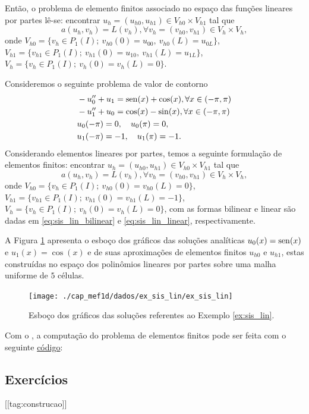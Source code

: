 Então, o problema de elemento finitos associado no espaço das funções lineares por partes lê-se: encontrar $u_h = (u_{h0}, u_{h1})\in V_{h0}\times V_{h1}$ tal que
\begin{equation}
  a(u_h, v_h) = L(v_h), \forall v_h = (v_{h0}, v_{h1})\in V_h\times V_h,
\end{equation}
onde $V_{h0} = \{v_h\in P_1(I);~v_{h0}(0)=u_{00},~v_{h0}(L)=u_{0L}\}$, $V_{h1}=\{v_{h1}\in P_1(I);~v_{h1}(0)=u_{10},~v_{h1}(L)=u_{1L}\}$, $V_h = \{v_h\in P_1(I);~v_h(0)=v_h(L)=0\}$.

\begin{ex}\label{ex:sis_lin}
  Consideremos o seguinte problema de valor de contorno
\begin{align}
  &-u_0'' + u_1 = \operatorname{sen}(x)+\cos(x),\forall x\in (-\pi, \pi)\\ 
  &-u_1'' + u_0 = \cos(x)-\sin(x),\forall x\in (-\pi, \pi)\\
  &u_0(-\pi)=0,\quad u_0(\pi)=0,\\
  &u_1(-\pi)=-1,\quad u_1(\pi)=-1.
\end{align}
Considerando elementos lineares por partes, temos a seguinte formulação de elementos finitos: encontrar $u_h = (u_{h0}, u_{h1})\in V_{h0}\times V_{h1}$ tal que
\begin{equation}
  a(u_h, v_h) = L(v_h), \forall v_h = (v_{h0}, v_{h1})\in V_h\times V_h,
\end{equation}
onde $V_{h0} = \{v_h\in P_1(I);~v_{h0}(0)=v_{h0}(L)=0\}$, $V_{h1}=\{v_{h1}\in P_1(I);~v_{h1}(0)=v_{h1}(L)=-1\}$, $V_h = \{v_h\in P_1(I);~v_h(0)=v_h(L)=0\}$, com as formas bilinear e linear são dadas em \eqref{eq:sis_lin_bilinear} e \eqref{eq:sis_lin_linear}, respectivamente.

A Figura \ref{fig:ex_sis_lin} apresenta o esboço dos gráficos das soluções analíticas $u_0(x)=\operatorname{sen}(x)$ e $u_1(x)=\cos(x)$ e de suas aproximações de elementos finitos $u_{h0}$ e $u_{h1}$, estas construídas no espaço dos polinômios lineares por partes sobre uma malha uniforme de $5$ células.

\begin{figure}[h!]
  \centering
  \texttt{[image: ./cap\_mef1d/dados/ex\_sis\_lin/ex\_sis\_lin]}
  \caption{Esboço dos gráficos das soluções referentes ao Exemplo \ref{ex:sis_lin}.}
  \label{fig:ex_sis_lin}
\end{figure}

\ifispython
Com o \fenics, a computação do problema de elementos finitos pode ser feita com o seguinte \href{https://github.com/phkonzen/notas/blob/master/src/MetodoElementosFinitos/cap_mef1d/dados/ex_sis_lin/ex_sis_lin.py}{código}:

\fi
\end{ex}

\subsection{Exercícios}
[[tag:construcao]]

